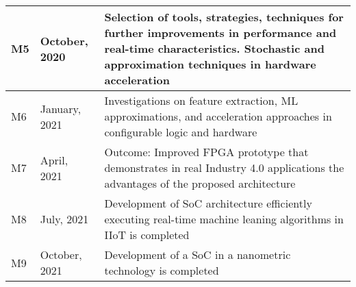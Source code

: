 \begin{longtable}{|l|l|m{9cm}|}
		M5                 & October, 2020   & Selection of tools, strategies, techniques for further improvements in performance and real-time characteristics. Stochastic and approximation techniques in hardware acceleration                                                                                                                                                                                                                                                                                                  \\ \hline
		M6                 & January, 2021   & Investigations on feature extraction, ML approximations, and acceleration approaches in configurable logic and hardware                                                                                                                                                                                                                                                                                                                                                             \\ \hline
		M7                 & April, 2021     & Outcome: Improved FPGA prototype that demonstrates in real Industry 4.0 applications the advantages of the proposed architecture                                                                                                                                                                                                                                                                                                                                                    \\ \hline
		M8                 & July, 2021      & Development of SoC architecture efficiently executing real-time machine leaning algorithms in IIoT is completed                                                                                                                                                                                                                                                                                                                                                                     \\ \hline
		M9                 & October, 2021   & Development of a SoC in a nanometric technology is completed                                                                                                                                                                                                                                                                                                                                                                                                                        \\ \hline

\end{longtable}
